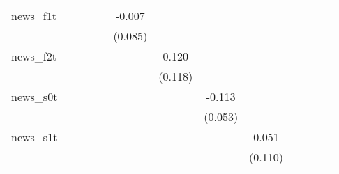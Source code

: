 {\begin{tabular}{l*{12}{c}}
\addlinespace
news\_f1t    &                     &                     &                     &                     &      -0.007         &                     &                     &                     &                     &                     &                     &                     \\
            &                     &                     &                     &                     &     (0.085)         &                     &                     &                     &                     &                     &                     &                     \\
\addlinespace
news\_f2t    &                     &                     &                     &                     &                     &       0.120         &                     &                     &                     &                     &                     &                     \\
            &                     &                     &                     &                     &                     &     (0.118)         &                     &                     &                     &                     &                     &                     \\
\addlinespace
news\_s0t    &                     &                     &                     &                     &                     &                     &      -0.113\sym{**} &                     &                     &                     &                     &                     \\
            &                     &                     &                     &                     &                     &                     &     (0.053)         &                     &                     &                     &                     &                     \\
\addlinespace
news\_s1t    &                     &                     &                     &                     &                     &                     &                     &       0.051         &                     &                     &                     &                     \\
            &                     &                     &                     &                     &                     &                     &                     &     (0.110)         &                     &                     &                     &                     \\

\end{tabular}}
